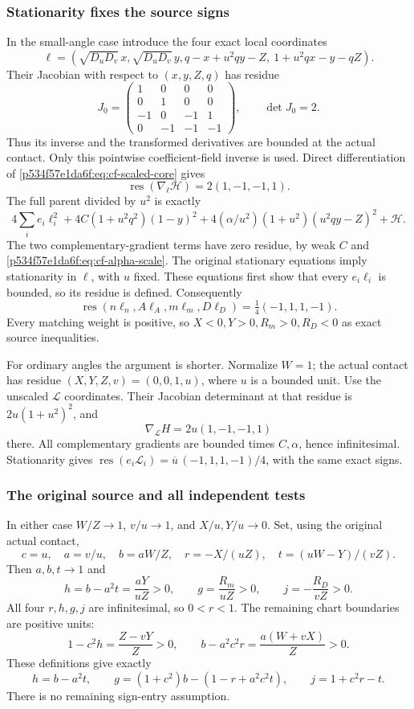 \subsubsection*{Stationarity fixes the source signs}
In the small-angle case introduce the four exact local coordinates
\[
\ell=\left(\sqrt{D_uD_v}\,x,\sqrt{D_uD_v}\,y,
 q-x+u^2qy-Z,\ 1+u^2qx-y-qZ\right).
\]
Their Jacobian with respect to \((x,y,Z,q)\) has residue
\[
J_0=\begin{pmatrix}
1&0&0&0\\0&1&0&0\\-1&0&-1&1\\0&-1&-1&-1
\end{pmatrix},\qquad \det J_0=2.
\]
Thus its inverse and the transformed derivatives are bounded at the
actual contact. Only this pointwise coefficient-field inverse is used.
Direct differentiation of \eqref{p534f57e1da6f:eq:cf-scaled-core} gives
\[
\operatorname{res}(\nabla_\ell\mathcal H)=2(1,-1,-1,1).
\]
The full parent divided by \(u^2\) is exactly
\[
4\sum_i e_i\ell_i^2
 +4C(1+u^2q^2)(1-y)^2
 +4(\alpha/u^2)(1+u^2)(u^2qy-Z)^2+\mathcal H.
\]
The two complementary-gradient terms have zero residue, by weak \(C\)
and \eqref{p534f57e1da6f:eq:cf-alpha-scale}. The original stationary equations imply
stationarity in \(\ell\), with \(u\) fixed. These equations first show
that every \(e_i\ell_i\) is bounded, so its residue is defined. Consequently
\begin{equation}
\operatorname{res}(n\ell_n,A\ell_A,m\ell_m,D\ell_D)
                         =\tfrac14(-1,1,1,-1).        \label{p534f57e1da6f:eq:cf-sign-residue}
\end{equation}
Every matching weight is positive, so \(X<0,Y>0,R_m>0,R_D<0\)
as exact source inequalities.

For ordinary angles the argument is shorter. Normalize \(W=1\);
the actual contact has residue
\((X,Y,Z,v)=(0,0,1,u)\), where \(u\) is a bounded unit.
Use the unscaled \(\mathcal L\) coordinates. Their Jacobian determinant
at that residue is \(2u(1+u^2)^2\), and
\[
\nabla_{\mathcal L}H=2u(1,-1,-1,1)
\]
there. All complementary gradients are bounded times \(C,\alpha\),
hence infinitesimal. Stationarity gives
\(\operatorname{res}(e_i\mathcal L_i)
 =\overline u\,(-1,1,1,-1)/4\), with the same exact signs.

\subsubsection*{The original source and all independent tests}
In either case \(W/Z\to1\), \(v/u\to1\), and \(X/u,Y/u\to0\).
Set, using the original actual contact,
\[
c=u,\quad a=v/u,\quad b=aW/Z,\quad
r=-X/(uZ),\quad t=(uW-Y)/(vZ).
\]
Then \(a,b,t\to1\) and
\[
h=b-a^2t=\frac{aY}{uZ}>0,\qquad
g=\frac{R_m}{uZ}>0,\qquad j=-\frac{R_D}{vZ}>0.
\]
All four \(r,h,g,j\) are infinitesimal, so \(0<r<1\).
The remaining chart boundaries are positive units:
\[
1-c^2h=\frac{Z-vY}{Z}>0,\qquad
b-a^2c^2r=\frac{a(W+vX)}Z>0.
\]
These definitions give exactly
\[
h=b-a^2t,\qquad
g=(1+c^2)b-(1-r+a^2c^2t),\qquad j=1+c^2r-t.
\]
There is no remaining sign-entry assumption.

